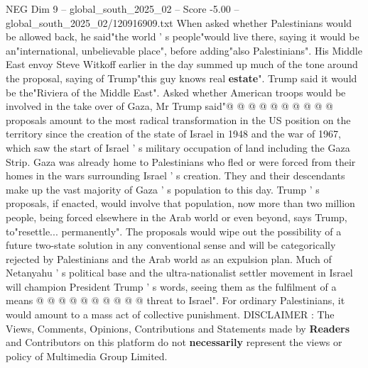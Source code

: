 \begin{textsample}{NEG Dim 9 – global\_south\_2025\_02 – Score -5.00 – global\_south\_2025\_02/120916909.txt}
When asked whether Palestinians would be allowed back, he said"the world ' s people"would live there, saying it would be an"international, unbelievable place", before adding"also Palestinians".
His Middle East envoy Steve Witkoff earlier in the day summed up much of the tone around the proposal, saying of Trump"this guy knows real \textbf{estate}".
Trump said it would be the"Riviera of the Middle East".
Asked whether American troops would be involved in the take over of Gaza, Mr Trump said"@ @ @ @ @ @ @ @ @ @ proposals amount to the most radical transformation in the US position on the territory since the creation of the state of Israel in 1948 and the war of 1967, which saw the start of Israel ' s military occupation of land including the Gaza Strip.
Gaza was already home to Palestinians who fled or were forced from their homes in the wars surrounding Israel ' s creation.
They and their descendants make up the vast majority of Gaza ' s population to this day.
Trump ' s proposals, if enacted, would involve that population, now more than two million people, being forced elsewhere in the Arab world or even beyond, says Trump, to"resettle... permanently".
The proposals would wipe out the possibility of a future two-state solution in any conventional sense and will be categorically rejected by Palestinians and the Arab world as an expulsion plan.
Much of Netanyahu ' s political base and the ultra-nationalist settler movement in Israel will champion President Trump ' s words, seeing them as the fulfilment of a means @ @ @ @ @ @ @ @ @ @ threat to Israel".
For ordinary Palestinians, it would amount to a mass act of collective punishment.
DISCLAIMER : The Views, Comments, Opinions, Contributions and Statements made by \textbf{Readers} and Contributors on this platform do not \textbf{necessarily} represent the views or policy of Multimedia Group Limited.

\end{textsample}
